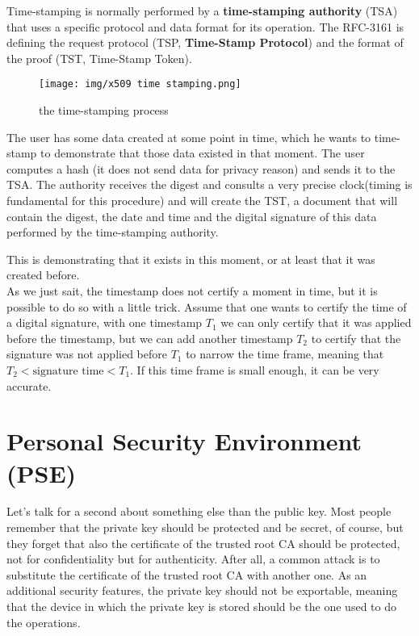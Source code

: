 Time-stamping is normally performed by a \textbf{time-stamping
authority} (TSA) that uses a specific protocol and data format for its
operation. The RFC-3161 is defining the request protocol (TSP,
\textbf{Time-Stamp Protocol}) and the format of the proof (TST,
Time-Stamp Token).

\begin{figure}[H]
  \centering
  \texttt{[image: img/x509 time stamping.png]}
  \label{fig:time-stamping}

  \caption{the time-stamping process}
\end{figure}

The user has some data created at some point in time, which he wants
to time-stamp to demonstrate that those data existed in that moment.
The user computes a hash (it does not send data for privacy reason)
and sends it to the TSA. The authority receives the digest and
consults a very precise clock(timing is fundamental for this
procedure) and will create the TST, a document that will contain the
digest, the date and time and the digital signature of this data
performed by the time-stamping authority.

This is demonstrating that it exists in this moment, or at least that
it was created before.\\

As we just sait, the timestamp does not certify a moment in time, but
it is possible to do so with a little trick. Assume that one wants to
certify the time of a digital signature, with one timestamp $T_1$ we can
only certify that it was applied before the timestamp, but we can 
add another timestamp $T_2$ to certify that the signature was not
applied before $T_1$ to narrow the time frame, meaning that $T_2 <
\text{signature time} < T_1$. If this time frame is small enough, it
can be very accurate.

\section{Personal Security Environment (PSE)}
Let's talk for a second about something else than the public key. Most
people remember that the private key should be protected and be
secret, of course, but they forget that also the certificate of the
trusted root CA should be protected, not for confidentiality but for
authenticity. After all, a common attack is to substitute the
certificate of the trusted root CA with another one. As an additional
security features, the private key should not be exportable, meaning
that the device in which the private key is stored should be the one
used to do the operations.\\

